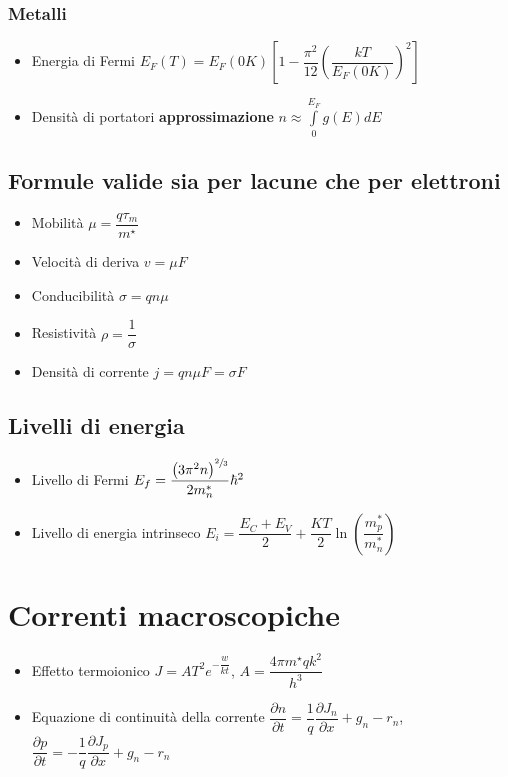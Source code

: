 \documentclass{article}
\begin{document}
\subsubsection{Metalli}
\begin{itemize}
  \item Energia di Fermi \( E_F(T) = E_F(0 K) \left[ 1 - \dfrac{\pi ^ 2}{12} \left( \dfrac{kT}{E_F(0 K)}\right) ^ 2\right]\)
  \item Densità di portatori \textbf{approssimazione} \( n \approx \int\limits_{0}^{E_F} g(E) dE \)
\end{itemize}

\subsection{Formule valide sia per lacune che per elettroni}
\begin{itemize}
  \item Mobilità \( \mu = \dfrac{q \tau_m}{m^\star} \)
  \item Velocità di deriva \( v = \mu F \)
  \item Conducibilità \( \sigma = q n \mu \)
  \item Resistività \( \rho = \dfrac{1}{\sigma} \)
  \item Densità di corrente \( j = q n \mu F = \sigma F \)
\end{itemize}

\subsection{Livelli di energia}
\begin{itemize}
  \item Livello di Fermi \( E_f = \dfrac{ \left(3 \pi^2 n\right)^{\sfrac{2}{3}} }{2 m_n^*} \hbar ^ 2 \)
  \item Livello di energia intrinseco \( E_i = \dfrac{E_C + E_V}{2} + \dfrac{K T}{2} \ln\left( \dfrac{m_p^*}{m_n^*}\right) \)
\end{itemize}

\section{Correnti macroscopiche}
\begin{itemize}
  \item Effetto termoionico \( J = A T ^ 2 e ^ {-\dfrac{w}{kt}} \), \( A = \dfrac{4 \pi m ^ \star q k ^2}{h ^ 3} \)
  \item Equazione di continuità della corrente \( \dfrac{\partial n}{\partial t} = \dfrac{1}{q} \dfrac{\partial J_n}{\partial x} + g_n - r_n \), \( \dfrac{\partial p}{\partial t} =  -\dfrac{1}{q} \dfrac{\partial J_p}{\partial x} + g_n - r_n  \)
\end{itemize}
\end{document}
